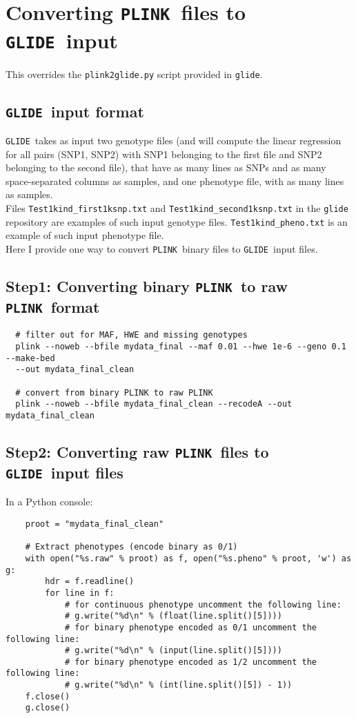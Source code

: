 \documentclass{article}
\newcommand{\red}[1]{{\color{MyOrange}{\textbf{#1}}}}
\newcommand{\glide}{\texttt{GLIDE}}
\newcommand{\plink}{\texttt{PLINK}}
\begin{document}
\section{Converting \plink\ files to \glide\ input}

\red{Note:} This overrides the \texttt{plink2glide.py} script provided in \texttt{glide}.

\subsection{\glide\ input format}
\glide\ takes as input two genotype files (and will compute the linear regression for all pairs (SNP1, SNP2) with SNP1 belonging to the first file and SNP2 belonging to the second file), that have as many lines as SNPs and as many space-separated columns as samples, and one phenotype file, with as many lines as samples. \\

Files \texttt{Test1kind\_first1ksnp.txt} and \texttt{Test1kind\_second1ksnp.txt} in the \texttt{glide} repository are examples of such input genotype files. \texttt{Test1kind\_pheno.txt} is an example of such input phenotype file.\\

Here I provide one way to convert \plink\ binary files to \glide\ input files.

\subsection{Step1: Converting binary \plink\ to raw \plink\ format}
\begin{verbatim}
  # filter out for MAF, HWE and missing genotypes
  plink --noweb --bfile mydata_final --maf 0.01 --hwe 1e-6 --geno 0.1 --make-bed 
  --out mydata_final_clean

  # convert from binary PLINK to raw PLINK
  plink --noweb --bfile mydata_final_clean --recodeA --out mydata_final_clean
\end{verbatim}

\subsection{Step2: Converting raw \plink\ files to \glide\ input files}
In a Python console:\\
\begin{verbatim}
    proot = "mydata_final_clean"

    # Extract phenotypes (encode binary as 0/1) 
    with open("%s.raw" % proot) as f, open("%s.pheno" % proot, 'w') as g:
        hdr = f.readline() 
        for line in f:
            # for continuous phenotype uncomment the following line:
            # g.write("%d\n" % (float(line.split()[5])))
            # for binary phenotype encoded as 0/1 uncomment the following line:
            # g.write("%d\n" % (input(line.split()[5])))
            # for binary phenotype encoded as 1/2 uncomment the following line:
            # g.write("%d\n" % (int(line.split()[5]) - 1))
    f.close()
    g.close()
\end{verbatim}
\end{document}
